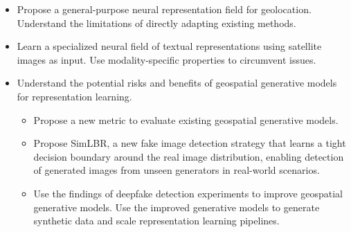 \begin{itemize}
     \item Propose a general-purpose neural representation field for geolocation. Understand the limitations of directly adapting existing methods.
    \item Learn a specialized neural field of textual representations using satellite images as input. Use modality-specific properties to circumvent issues. 
    \item Understand the potential risks and benefits of geospatial generative models for representation learning. 
    \begin{itemize}
        \item Propose a new metric to evaluate existing geospatial generative models.
        \item Propose SimLBR, a new fake image detection strategy that learns a tight decision boundary around the real image distribution, enabling detection of generated images from unseen generators in real-world scenarios.
        \item Use the findings of deepfake detection experiments to improve geospatial generative models. Use the improved generative models to generate synthetic data and scale representation learning pipelines.
    \end{itemize}
\end{itemize}

